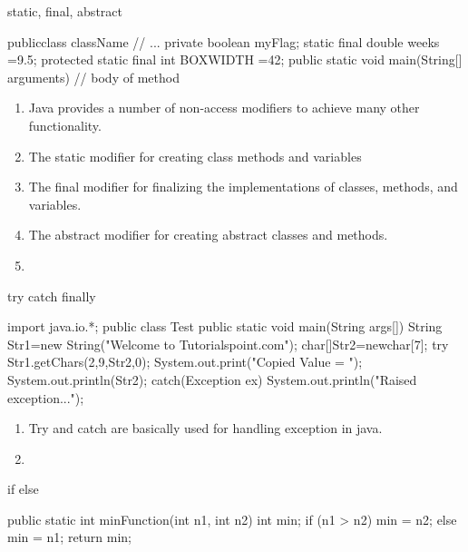 \documentclass[11pt]{beamer}
\begin{document}
\begin{frame}{static, final, abstract}

\begin{java}
	publicclass className {
// ...
}
private boolean myFlag;
static final double weeks =9.5;
protected static final int BOXWIDTH =42;
public static void main(String[] arguments){
// body of method
}

\end{java}

\begin{enumerate}
\item Java provides a number of non-access modifiers to achieve many other functionality.
\item The static modifier for creating class methods and variables 
\item The final modifier for finalizing the implementations of classes, methods, and variables.
\item The abstract modifier for creating abstract classes and methods.
\item 


\end{enumerate}
\end{frame}



\begin{frame}[containsverbatim]{try catch finally}

\begin{java}

import java.io.*;
public class Test{
public static void main(String args[]){
String Str1=new String("Welcome to Tutorialspoint.com");
char[]Str2=newchar[7];
try{
Str1.getChars(2,9,Str2,0);
System.out.print("Copied Value = ");
System.out.println(Str2);
}catch(Exception ex){
System.out.println("Raised exception...");
}
}
}

\begin{enumerate}
\item Try and catch are basically used for handling exception in java.
\item 


\end{enumerate}


\end{java}



\end{frame}


\begin{frame}{if else}

\begin{java}
	public static int minFunction(int n1, int n2) {
int min;
if (n1 > n2)
min = n2;
else
min = n1;
return min;
}

\end{java}




\end{frame}
\end{document}
